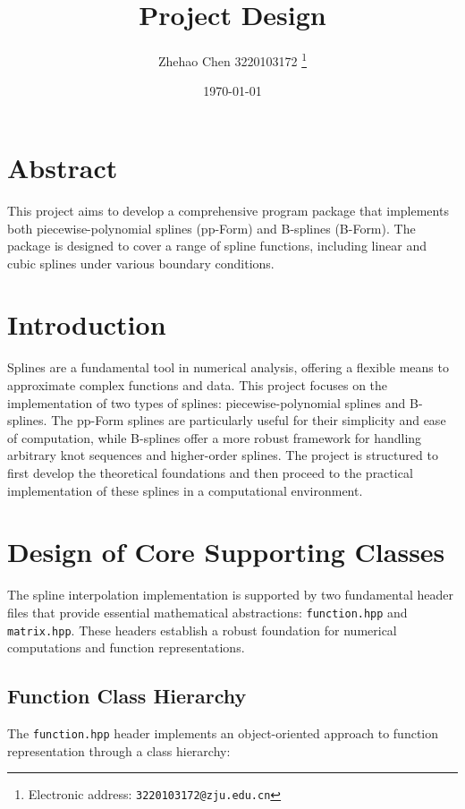 \documentclass{article}
\title{\textbf{Project Design}}
\author{Zhehao Chen 3220103172
  \thanks{Electronic address: \texttt{3220103172@zju.edu.cn}}}
\date{\today}
\begin{document}
\maketitle

\section*{Abstract}
This project aims to develop a comprehensive program package that implements both piecewise-polynomial splines (pp-Form) and B-splines (B-Form). The package is designed to cover a range of spline functions, including linear and cubic splines under various boundary conditions.

\tableofcontents
\clearpage

\section{Introduction}
Splines are a fundamental tool in numerical analysis, offering a flexible means to approximate complex functions and data. This project focuses on the implementation of two types of splines: piecewise-polynomial splines and B-splines. The pp-Form splines are particularly useful for their simplicity and ease of computation, while B-splines offer a more robust framework for handling arbitrary knot sequences and higher-order splines. The project is structured to first develop the theoretical foundations and then proceed to the practical implementation of these splines in a computational environment.

\section{Design of Core Supporting Classes}

The spline interpolation implementation is supported by two fundamental header files that provide essential mathematical abstractions: \texttt{function.hpp} and \texttt{matrix.hpp}. These headers establish a robust foundation for numerical computations and function representations.

\subsection{Function Class Hierarchy}
The \texttt{function.hpp} header implements an object-oriented approach to function representation through a class hierarchy:
\end{document}
